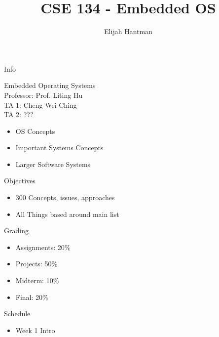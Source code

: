 \documentclass{report}
\title{\Huge{CSE 134 - Embedded OS}}
\author{\huge{Elijah Hantman}}
\date{}
\begin{document}
\maketitle
\newpage

\begin{description}
    \item Info 
        \begin{mdframed}
            Embedded Operating Systems\\
            Professor: Prof. Liting Hu\\
            TA 1: Cheng-Wei Ching\\
            TA 2: ???
        \end{mdframed}
        \begin{mdframed}
            \begin{itemize}
                \item OS Concepts
                \item Important Systems Concepts
                \item Larger Software Systems
            \end{itemize}
        \end{mdframed}
        \begin{mdframed}
            Objectives
            \begin{itemize}
                \item 300 Concepts, issues, approaches
                \item All Things based around main list
            \end{itemize}
        \end{mdframed}
    \item Grading
        \begin{mdframed}
           \begin{itemize}
               \item Assignments: 20\%
               \item Projects: 50\%
               \item Midterm: 10\%
               \item Final: 20\%
           \end{itemize} 
        \end{mdframed}
    \item Schedule
        \begin{mdframed}
            \begin{itemize}
                \item Week 1 Intro

\end{itemize}
\end{mdframed}
\end{description}
\end{document}
